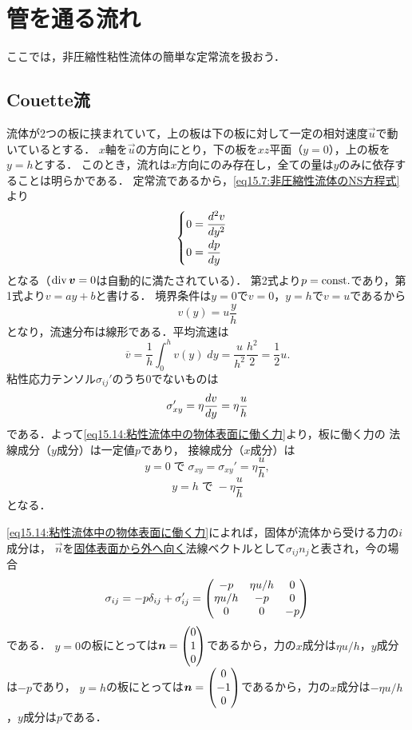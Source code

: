 \section{管を通る流れ}

ここでは，非圧縮性粘性流体の簡単な定常流を扱おう．


\subsection*{Couette流}
流体が2つの板に挟まれていて，上の板は下の板に対して一定の相対速度$\vec{u}$で動いているとする．
$x$軸を$\vec{u}$の方向にとり，下の板を$xz$平面（$y=0$），上の板を$y=h$とする．
このとき，流れは$x$方向にのみ存在し，全ての量は$y$のみに依存することは明らかである．
定常流であるから，\eqref{eq15.7:非圧縮性流体のNS方程式}より
\[
    \begin{cases}
        0 = \ddv[2]{v}{y} \\[7pt]
        0 = \ddv{p}{y}
    \end{cases}
\]
となる（$\operatorname{div}\vb*{v}=0$は自動的に満たされている）．
第2式より$p=\mathrm{const.}$であり，第1式より$v=ay+b$と書ける．
境界条件は$y=0$で$v=0$，$y=h$で$v=u$であるから
\begin{equation}\label{eq17.1:平行平板間のCouette流}
    v(y) = u\frac{y}{h}
\end{equation}
となり，流速分布は線形である．平均流速は
\begin{equation}
    \overline{v} = \frac{1}{h} \int_0^h v(y)\; dy = \frac{u}{h^2} \frac{h^2}{2} = \frac{1}{2}u .
\end{equation}
粘性応力テンソル$\sigma_{ij}'$のうち0でないものは
\[
    \sigma_{xy}' = \eta \dv{v}{y} = \eta\frac{u}{h}
\]
である．よって\eqref{eq15.14:粘性流体中の物体表面に働く力}より，板に働く力の
法線成分（$y$成分）は一定値$p$であり，
接線成分（$x$成分）は
\begin{equation}
    y=0 \;\text{で}\; \sigma_{xy} = \sigma_{xy}' = \eta\frac{u}{h},
\end{equation}
\[
    y=h \;\text{で}\; -\eta\frac{u}{h}
\]
となる．

\begin{details}
\eqref{eq15.14:粘性流体中の物体表面に働く力}によれば，固体が流体から受ける力の$i$成分は，
$\vec{n}$を\underline{固体表面から外へ向く}法線ベクトルとして$\sigma_{ij}n_j$と表され，今の場合
\[
    \sigma_{ij} = -p \delta_{ij} + \sigma_{ij}'
    = \pmqty{
        -p & \eta u/h & 0 \\
        \eta u/h & -p & 0 \\
        0 & 0 & -p 
    }
\]
である．
$y=0$の板にとっては$\vec{n}=\pmqty{0 \\ 1 \\ 0}$であるから，力の$x$成分は$\eta u/h$，$y$成分は$-p$であり，
$y=h$の板にとっては$\vec{n}=\pmqty{0 \\ -1 \\ 0}$であるから，力の$x$成分は$-\eta u/h$，$y$成分は$p$である．
\end{details}


